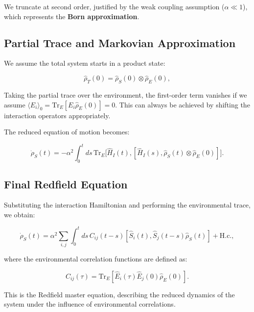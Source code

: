 We truncate at second order, justified by the weak coupling assumption ($\alpha \ll 1$), which represents the \textbf{Born approximation}.

\subsection{Partial Trace and Markovian Approximation}

We assume the total system starts in a product state:

\begin{equation}
    \hat{\rho}_T(0) = \hat{\rho}_S(0) \otimes \hat{\rho}_E(0),
    \label{eq:Initial_Product_State}
\end{equation}

Taking the partial trace over the environment, the first-order term vanishes if we assume $\langle E_i \rangle_0 = \mathrm{Tr}_E[E_i \hat{\rho}_E(0)] = 0$. This can always be achieved by shifting the interaction operators appropriately.

The reduced equation of motion becomes:

\begin{equation}
    \dot{\rho}_S(t) = - \alpha^2 \int_0^t ds \, \mathrm{Tr}_E \big[\hat{H}_I(t), [\hat{H}_I(s), \hat{\rho}_S(t) \otimes \hat{\rho}_E(0)]\big].
    \label{eq:Partial_Trace_Derivation}
\end{equation}

\subsection{Final Redfield Equation}

Substituting the interaction Hamiltonian and performing the environmental trace, we obtain:

\begin{equation}
    \dot{\rho}_S(t) = \alpha^2 \sum_{i,j} \int_0^t ds \, C_{ij}(t-s) \left[ \hat{S}_i(t), \hat{S}_j(t-s) \hat{\rho}_S(t) \right] + \text{H.c.},
    \label{eq:Redfield_Equation_Final}
\end{equation}

where the environmental correlation functions are defined as:

\begin{equation}
    C_{ij}(\tau) = \mathrm{Tr}_E[\hat{E}_i(\tau) \hat{E}_j(0) \hat{\rho}_E(0)].
    \label{eq:Environment_Correlation_Function}
\end{equation}

This is the Redfield master equation, describing the reduced dynamics of the system under the influence of environmental correlations.

